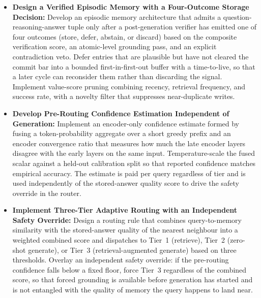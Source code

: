 \begin{itemize}
    \item \textbf{Design a Verified Episodic Memory with a Four-Outcome Storage Decision:} Develop an episodic memory architecture that admits a question-reasoning-answer tuple only after a post-generation verifier has emitted one of four outcomes (store, defer, abstain, or discard) based on the composite verification score, an atomic-level grounding pass, and an explicit contradiction veto. Defer entries that are plausible but have not cleared the commit bar into a bounded first-in-first-out buffer with a time-to-live, so that a later cycle can reconsider them rather than discarding the signal. Implement value-score pruning combining recency, retrieval frequency, and success rate, with a novelty filter that suppresses near-duplicate writes.

    \item \textbf{Develop Pre-Routing Confidence Estimation Independent of Generation:} Implement an encoder-only confidence estimate formed by fusing a token-probability aggregate over a short greedy prefix and an encoder convergence ratio that measures how much the late encoder layers disagree with the early layers on the same input. Temperature-scale the fused scalar against a held-out calibration split so that reported confidence matches empirical accuracy. The estimate is paid per query regardless of tier and is used independently of the stored-answer quality score to drive the safety override in the router.

    \item \textbf{Implement Three-Tier Adaptive Routing with an Independent Safety Override:} Design a routing rule that combines query-to-memory similarity with the stored-answer quality of the nearest neighbour into a weighted combined score and dispatches to Tier~1 (retrieve), Tier~2 (zero-shot generate), or Tier~3 (retrieval-augmented generate) based on three thresholds. Overlay an independent safety override: if the pre-routing confidence falls below a fixed floor, force Tier~3 regardless of the combined score, so that forced grounding is available before generation has started and is not entangled with the quality of memory the query happens to land near.


\end{itemize}
